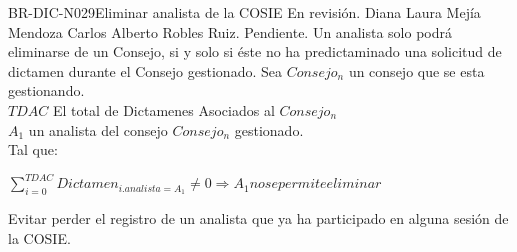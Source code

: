 \begin{BusinessRule}{BR-DIC-N029}{Eliminar analista de la COSIE}
	{\bcCondition} %
	{\btEnabler}     %
	{\blControlling}     %
	\BRItem[Estado] En revisión.
	 Diana Laura Mejía Mendoza 
	 Carlos Alberto Robles Ruiz.
	 Pendiente.
	\BRItem[Descripción] Un analista solo podrá eliminarse de un Consejo, si y solo si éste no ha predictaminado una solicitud de dictamen durante el Consejo gestionado. 
	\BRItem[Sentencia] \cdtEmpty  
	Sea $Consejo_{n}$ un consejo que se esta gestionando.\\
	$ TDAC$ El total de Dictamenes Asociados al $Consejo_{n}$\\
	$A_{1}$ un analista del consejo  $Consejo_{n}$ gestionado.\\
	Tal que:
	\begin{center}
	$\sum_{i=0}^{TDAC}Dictamen_{i.analista=A_{1}} \neq 0 \Rightarrow A_{1}  no se permite eliminar $
	\end{center}
	
%	
	\BRItem[Motivación] Evitar perder el registro de un analista que ya ha participado en alguna sesión de la COSIE.
\end{BusinessRule}

